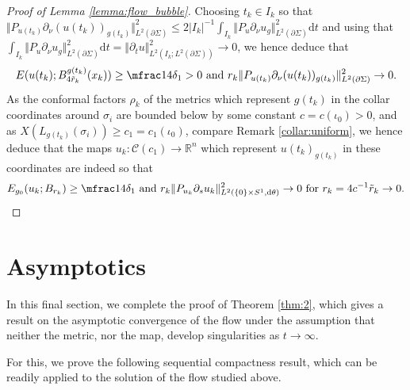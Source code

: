 \documentclass[10pt,reqno]{amsart}
\theoremstyle{plain}
\theoremstyle{definition}
\numberwithin{equation}{section}
\newcommand{\de}{\delta}
\newcommand{\si}{\sigma}
\newcommand{\Si}{\Sigma}
\newcommand{\R}{\ensuremath{{\mathbb R}}}
\newcommand{\norm}[1]{\Vert#1\Vert}
\newcommand{\dd}{\mathrm{d}} %
\newcommand{\pt}{\partial_t}
\newcommand{\abs}[1]{\vert#1\vert}
\newcommand{\Cyl}{{\mathscr{C}}}
\newcommand{\pSi}{{\partial \Sigma}}
\newcommand{\p}{\partial} %
\begin{document}
\begin{proof}[Proof of Lemma \ref{lemma:flow_bubble}]
    Choosing $t_k\in I_k$ so that $\norm{P_{u(t_k)}\p_\nu (u(t_k))_{g(t_k)}}_{L^2(\p\Si)}^2 \leq 2 \abs{I_k}^{-1} \int_{I_k}\norm{P_{u}\p_\nu u_{g}}_{L^2(\p\Si)}^2 \dd t$ and using that $\int_{I_k}\norm{P_{u}\p_\nu u_{g}}_{L^2(\p\Si)}^2 \dd t = \norm{\pt u}_{L^2(I_k;L^2(\pSi))}^2\to 0$, we hence deduce that 
    \begin{equation*}
        E(u( t_k);B^{g(t_k)}_{4 \tilde r_k}( x_k))\geq \mfrac14\de_1>0 \text{ and } r_k\norm{P_{u(t_k)}\p_\nu (u(t_k))_{g(t_k)}}_{L^2(\p\Si)}^2\rightarrow 0.
    \end{equation*}    
    As the conformal factors $\rho_k$ of the metrics which represent $g(t_k)$ in the collar coordinates around $\si_i$ are bounded below by some constant $c=c(\iota_0)>0$, and as $X(L_{g(t_k)}(\si_i))\geq c_1=c_1(\iota_0)$, compare Remark \ref{collar:uniform}, we hence deduce that the maps $u_k:\Cyl(c_1)\to \R^n$ which represent $u(t_k)_{g(t_k)}$ in these coordinates are indeed so that 
    $$ E_{g_0}(u_k;B_{r_k}) \geq \mfrac14 \de_1 \text{ and } r_k\norm{P_{u_k}\p_s u_k}_{L^2(\{0\}\times S^1,\dd \theta)}^2\to 0 \text{ for }r_k=4c^{-1}\tilde r_k\to 0. $$ 
\end{proof}


\section{Asymptotics}\label{sect:asym}
In this final section, we complete the proof of Theorem \ref{thm:2}, which gives a result on the asymptotic convergence of the flow under the assumption that neither the metric, nor the map, develop singularities as $t \rightarrow \infty$.

For this, we prove the following sequential compactness result, which can be readily applied to the solution of the flow studied above.
\end{document}
